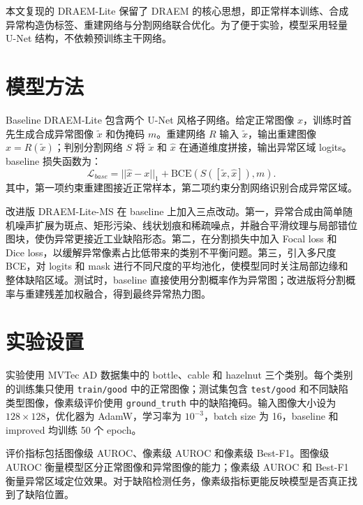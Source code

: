 \documentclass[UTF8,a4paper,twocolumn]{ctexart}
\begin{document}
本文复现的 DRAEM-Lite 保留了 DRAEM 的核心思想，即正常样本训练、合成异常构造伪标签、重建网络与分割网络联合优化。为了便于实验，模型采用轻量 U-Net 结构，不依赖预训练主干网络。

\section{模型方法}
Baseline DRAEM-Lite 包含两个 U-Net 风格子网络。给定正常图像 $x$，训练时首先生成合成异常图像 $\tilde{x}$ 和伪掩码 $m$。重建网络 $R$ 输入 $\tilde{x}$，输出重建图像 $\hat{x}=R(\tilde{x})$；判别分割网络 $S$ 将 $\tilde{x}$ 和 $\hat{x}$ 在通道维度拼接，输出异常区域 logits。baseline 损失函数为：
\[
\mathcal{L}_{base}=||\hat{x}-x||_1+
\mathrm{BCE}(S([\tilde{x},\hat{x}]),m).
\]
其中，第一项约束重建图接近正常样本，第二项约束分割网络识别合成异常区域。

改进版 DRAEM-Lite-MS 在 baseline 上加入三点改动。第一，异常合成由简单随机噪声扩展为斑点、矩形污染、线状划痕和稀疏噪点，并融合平滑纹理与局部错位图块，使伪异常更接近工业缺陷形态。第二，在分割损失中加入 Focal loss 和 Dice loss，以缓解异常像素占比低带来的类别不平衡问题。第三，引入多尺度 BCE，对 logits 和 mask 进行不同尺度的平均池化，使模型同时关注局部边缘和整体缺陷区域。测试时，baseline 直接使用分割概率作为异常图；改进版将分割概率与重建残差加权融合，得到最终异常热力图。

\section{实验设置}
实验使用 MVTec AD 数据集中的 bottle、cable 和 hazelnut 三个类别。每个类别的训练集只使用 \texttt{train/good} 中的正常图像；测试集包含 \texttt{test/good} 和不同缺陷类型图像，像素级评价使用 \texttt{ground\_truth} 中的缺陷掩码。输入图像大小设为 $128\times128$，优化器为 AdamW，学习率为 $10^{-3}$，batch size 为 16，baseline 和 improved 均训练 50 个 epoch。

评价指标包括图像级 AUROC、像素级 AUROC 和像素级 Best-F1。图像级 AUROC 衡量模型区分正常图像和异常图像的能力；像素级 AUROC 和 Best-F1 衡量异常区域定位效果。对于缺陷检测任务，像素级指标更能反映模型是否真正找到了缺陷位置。
\end{document}
